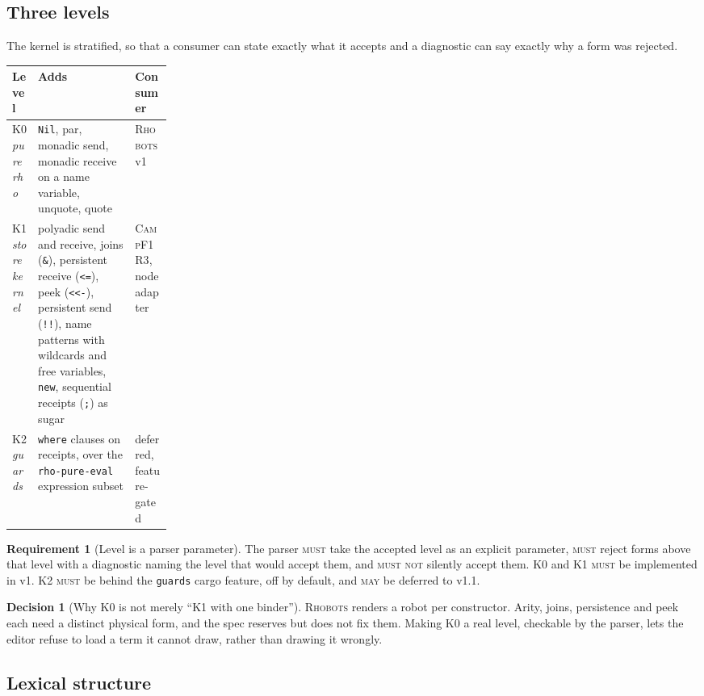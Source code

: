 \documentclass[11pt,a4paper]{article}
\newcommand{\code}[1]{\texttt{#1}}
\newcommand{\Camp}{\textsc{CampF1R3}}
\newcommand{\Rhobots}{\textsc{Rhobots}}
\newcommand{\MUST}{\textsc{must}}
\newcommand{\MUSTNOT}{\textsc{must not}}
\newcommand{\MAY}{\textsc{may}}
\theoremstyle{definition}
\newtheorem{requirement}[definition]{Requirement}
\newtheorem{decision}[definition]{Decision}
\theoremstyle{plain}
\begin{document}
\subsection{Three levels}

The kernel is stratified, so that a consumer can state exactly what it accepts
and a diagnostic can say exactly why a form was rejected.

\begin{center}
\begin{tabularx}{\linewidth}{@{}l>{\raggedright\arraybackslash}X>{\raggedright\arraybackslash}p{0.23\linewidth}@{}}
\toprule
Level & Adds & Consumer\\
\midrule
K0 \emph{pure rho} & \code{Nil}, par, monadic send, monadic receive on a name
variable, unquote, quote & \Rhobots{} v1\\
K1 \emph{store kernel} & polyadic send and receive, joins (\code{\&}),
persistent receive (\code{<=}), peek (\code{<<-}), persistent send (\code{!!}),
name patterns with wildcards and free variables, \code{new}, sequential
receipts (\code{;}) as sugar & \Camp, node adapter\\
K2 \emph{guards} & \code{where} clauses on receipts, over the
\code{rho-pure-eval} expression subset & deferred, feature-gated\\
\bottomrule
\end{tabularx}
\end{center}

\begin{requirement}[Level is a parser parameter]\label{req:level}
The parser \MUST{} take the accepted level as an explicit parameter, \MUST{}
reject forms above that level with a diagnostic naming the level that would
accept them, and \MUSTNOT{} silently accept them. K0 and K1 \MUST{} be
implemented in v1. K2 \MUST{} be behind the \code{guards} cargo feature, off by
default, and \MAY{} be deferred to v1.1.
\end{requirement}

\begin{decision}[Why K0 is not merely ``K1 with one binder'']
\Rhobots{} renders a robot per constructor. Arity, joins, persistence and peek
each need a distinct physical form, and the spec reserves but does not fix them.
Making K0 a real level, checkable by the parser, lets the editor refuse to load
a term it cannot draw, rather than drawing it wrongly.
\end{decision}

\subsection{Lexical structure}
\end{document}
